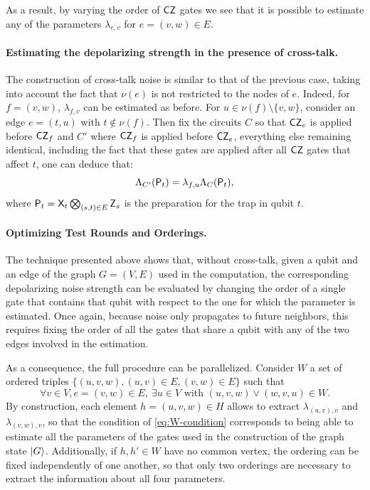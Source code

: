 As a result, by varying the order of \(\mathsf{CZ}\) gates we see that it is possible to estimate any of the parameters \(\lambda_{e,v}\) for \(e = (v,w) \in E\).

\paragraph{Estimating the depolarizing strength in the presence of cross-talk.}
The construction of cross-talk noise is similar to that of the previous case, taking into account the fact that \(\nu(e) \) is not restricted to the nodes of \(e\). Indeed, for \(f = (v,w)\), \(\lambda_{f,v}\) can be estimated as before. For \(u \in \nu(f)\setminus \{v,w\}\), consider an edge \(e =(t,u)\) with \(t \notin \nu(f)\). Then fix the circuits \(C\) so that \(\mathsf{CZ}_e\) is applied before \(\mathsf{CZ}_f\) and \(C'\) where \(\mathsf{CZ}_f\) is applied before \(\mathsf{CZ}_e\), everything else remaining identical, including the fact that these gates are applied after all \(\mathsf{CZ}\) gates that affect \(t\), one can deduce that:
\begin{equation}
\Lambda_{C'}(\mathsf{P}_t) = \lambda_{f,u}\Lambda_{C}(\mathsf{P}_t), 
\end{equation}
where \(\mathsf{P}_t = \mathsf{X}_t \bigotimes_{(s,t)\in E} \mathsf{Z}_{s}\) is the preparation for the trap in qubit \(t\).

\paragraph{Optimizing Test Rounds and Orderings.}
The technique presented above shows that, without cross-talk, given a qubit and an edge of the graph \(G=(V,E)\) used in the computation, the corresponding depolarizing noise strength can be evaluated by changing the order of a single gate that contains that qubit with respect to the one for which the parameter is estimated. Once again, because noise only propagates to future neighbors, this requires fixing the order of all the gates that share a qubit with any of the two edges involved in the estimation.

As a consequence, the full procedure can be parallelized. Consider \(W\) a set of ordered triples \(\{(u,v,w), (u,v) \in E,  (v,w) \in E\}\) such that
\begin{equation}
  \forall v \in V, e = (v,w) \in E, \ \exists u \in V \mbox{ with } (u,v,w) \vee (w,v,u) \in W \label{eq:W-condition}.  
\end{equation}
By construction, each element \(h = (u,v,w) \in H\) allows to extract \(\lambda_{(u,v),v}\) and \(\lambda_{(v,w),v}\), so that the condition of \cref{eq:W-condition} corresponds to being able to estimate all the parameters of the gates used in the construction of the graph state \(\ket G\). Additionally, if \(h,h' \in W\) have no common vertex, the ordering can be fixed independently of one another, so that only two orderings are necessary to extract the information about all four parameters.

